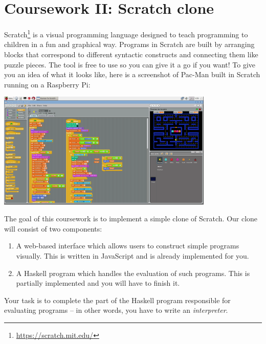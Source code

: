 
\newcommand{\deadlineTwoTime}{noon}
\newcommand{\deadlineTwoDate}{14 March 2019}
\newcommand{\submissionTwoURL}{https://tabula.warwick.ac.uk/coursework/submission/8abd8604-d71b-454d-a0c9-c315cec10a36}



\cleardoublepage
\chapter{Coursework II: Scratch clone}

Scratch\footnote{\url{https://scratch.mit.edu/}} is a visual programming language designed to teach programming to children in a fun and graphical way. Programs in Scratch are built by arranging blocks that correspond to different syntactic constructs and connecting them like puzzle pieces. The tool is free to use so you can give it a go if you want! To give you an idea of what it looks like, here is a screenshot of Pac-Man built in Scratch running on a Raspberry Pi:

\begin{center}
\includegraphics[width=390px]{cswk/scratch_rpi.png}
\end{center}

The goal of this coursework is to implement a simple clone of Scratch. Our clone will consist of two components:
\begin{enumerate}
    \item A web-based interface which allows users to construct simple programs visually. This is written in JavaScript and is already implemented for you.
    \item A Haskell program which handles the evaluation of such programs. This is partially implemented and you will have to finish it.
\end{enumerate}
Your task is to complete the part of the Haskell program responsible for evaluating programs -- in other words, you have to write an \emph{interpreter}.

